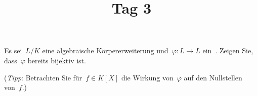 \documentclass{scrartcl}
\title{Tag 3}
\author{}
\date{}
\begin{document}
\maketitle
\vspace{-6em}

\begin{exercise}
  Es sei~$L/K$ eine algebraische Körpererweiterung und~$\varphi \colon L \to L$ ein~.
  Zeigen Sie, dass~$\varphi$ bereits bijektiv ist.

  (\emph{Tipp}: Betrachten Sie für~$f \in K[X]$ die Wirkung von~$\varphi$ auf den Nullstellen von~$f$.)
\end{exercise}
\end{document}
